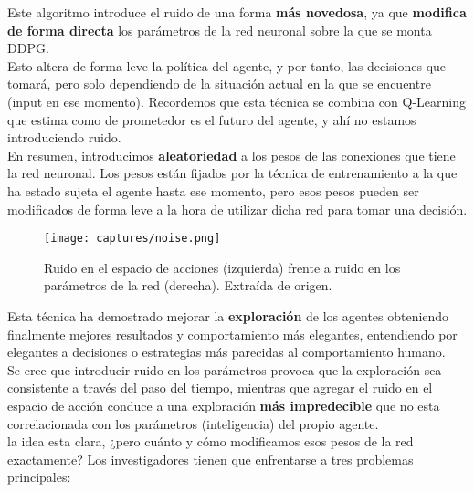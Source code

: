 \documentclass[11pt,fleqn]{book} %
\begin{document}
Este algoritmo introduce el ruido de una forma \textbf{más novedosa}, ya que \textbf{modifica de forma directa} los parámetros de la red neuronal sobre la que se monta DDPG. \\

Esto altera de forma leve la política del agente, y por tanto, las decisiones que tomará, pero solo dependiendo de la situación actual en la que se encuentre (input en ese momento). Recordemos que esta técnica se combina con Q-Learning que estima como de prometedor es el futuro del agente, y ahí no estamos introduciendo ruido. \\

En resumen, introducimos \textbf{aleatoriedad} a los pesos de las conexiones que tiene la red neuronal. Los pesos están fijados por la técnica de entrenamiento a la que ha estado sujeta el agente hasta ese momento, pero esos pesos pueden ser modificados de forma leve a la hora de utilizar dicha red para tomar una decisión.

\begin{figure}[H]
	\centering\texttt{[image: captures/noise.png]}
	\caption{Ruido en el espacio de acciones (izquierda) frente a ruido en los parámetros de la red (derecha). Extraída de origen. \cite{article:DDPG_2}}
	\label{fig:noise} %
\end{figure}

Esta técnica ha demostrado mejorar la \textbf{exploración} de los agentes obteniendo finalmente mejores resultados y comportamiento más elegantes, entendiendo por elegantes a decisiones o estrategias más parecidas al comportamiento humano. \\

Se cree que introducir ruido en los parámetros provoca que la exploración sea consistente a través del paso del tiempo, mientras que agregar el ruido en el espacio de acción conduce a una exploración \textbf{más impredecible} que no esta correlacionada con los parámetros (inteligencia) del propio agente. \\

la idea esta clara, ¿pero cuánto y cómo modificamos esos pesos de la red exactamente? Los investigadores tienen que enfrentarse a tres problemas principales: \\
\end{document}
